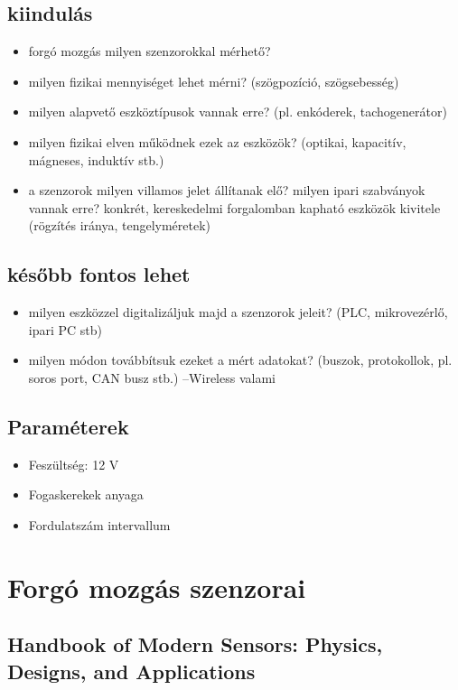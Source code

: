 \documentclass{article}
\begin{document}
	\subsection{kiindulás}
	\begin{itemize}
		\item forgó mozgás milyen szenzorokkal mérhető?
		\item milyen fizikai mennyiséget lehet mérni? (szögpozíció, szögsebesség)
		\item milyen alapvető eszköztípusok vannak erre? (pl. enkóderek, tachogenerátor)
		\item milyen fizikai elven működnek ezek az eszközök? (optikai, kapacitív, mágneses, induktív stb.)
		\item a szenzorok milyen villamos jelet állítanak elő? milyen ipari szabványok vannak erre?
		konkrét, kereskedelmi forgalomban kapható eszközök kivitele (rögzítés iránya, tengelyméretek)
	\end{itemize}
	
	\subsection{később fontos lehet}
	\begin{itemize}
		\item milyen eszközzel digitalizáljuk majd a szenzorok jeleit? (PLC, mikrovezérlő, ipari PC stb)
		\item milyen módon továbbítsuk ezeket a mért adatokat? (buszok, protokollok, pl. soros port, CAN busz stb.) --Wireless valami
	\end{itemize}
	
	\subsection{Paraméterek}
	\begin{itemize}
		\item Feszültség: 12 V
		\item Fogaskerekek anyaga
		\item Fordulatszám intervallum
		
	\end{itemize}
	
	
	
	\section{Forgó mozgás szenzorai}
	
	\subsection{Handbook of Modern Sensors: Physics, Designs, and Applications}
\end{document}
